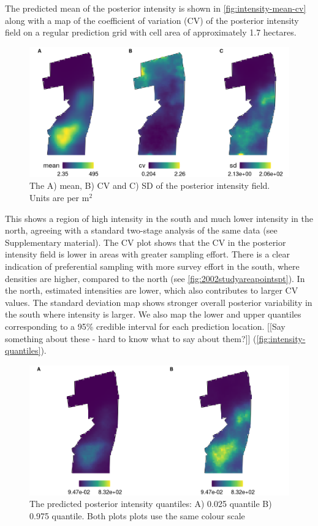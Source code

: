 \documentclass{stylefile16/statsoc}
\begin{document}
The predicted mean of the posterior intensity is shown in \autoref{fig:intensity-mean-cv} along with a map of the coefficient of variation (CV) of the posterior intensity field on a regular prediction grid with cell area of approximately 1.7 hectares.
\begin{figure}[h]
	\begin{center}
		\includegraphics[scale=0.525]{figures/intensity_mean_cv_sd.png}
		\caption{The A) mean, B) CV and C) SD of the posterior intensity field.  Units are per m$^2$}
		\label{fig:intensity-mean-cv}
	\end{center}
\end{figure}
This shows a region of high intensity in the south and much lower intensity in the north, agreeing with a standard two-stage analysis of the same data (see Supplementary material).  The CV plot shows that the CV in the posterior intensity field is lower in areas with greater sampling effort.  There is a clear indication of preferential sampling with more survey effort in the south, where densities are higher, compared to the north  (see \autoref{fig:2002studyareapointspt}).  In the north, estimated intensities are lower, which also contributes to larger CV values.  The standard deviation map shows stronger overall posterior variability in the south where intensity is larger.  We also map the lower and upper quantiles corresponding to a 95\% credible interval for each prediction location.  [[Say something about these - hard to know what to say about them?]]   (\autoref{fig:intensity-quantiles}).
\begin{figure}[h]
	\begin{center}
		\includegraphics[scale=0.525]{figures/intensity_quantiles.png}
		\caption{The predicted posterior intensity quantiles:  A) 0.025 quantile B) 0.975 quantile.  Both plots plots use the same colour scale}
		\label{fig:intensity-quantiles}
	\end{center}
\end{figure}
\end{document}
